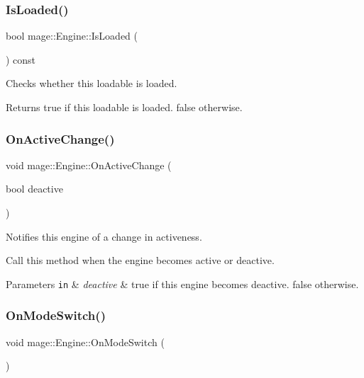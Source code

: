 \subsubsection{\texorpdfstring{Is\+Loaded()}{IsLoaded()}}
{\footnotesize\ttfamily bool mage\+::\+Engine\+::\+Is\+Loaded (\begin{DoxyParamCaption}{ }\end{DoxyParamCaption}) const\hspace{0.3cm}{\ttfamily [noexcept]}}

Checks whether this loadable is loaded.

\begin{DoxyReturn}{Returns}
{\ttfamily true} if this loadable is loaded. {\ttfamily false} otherwise. 
\end{DoxyReturn}
\hypertarget{classmage_1_1_engine_afd52a8088d6d37605cb352028098c508}{}\label{classmage_1_1_engine_afd52a8088d6d37605cb352028098c508} 
\subsubsection{\texorpdfstring{On\+Active\+Change()}{OnActiveChange()}}
{\footnotesize\ttfamily void mage\+::\+Engine\+::\+On\+Active\+Change (\begin{DoxyParamCaption}\item[{bool}]{deactive }\end{DoxyParamCaption})\hspace{0.3cm}{\ttfamily [noexcept]}}

Notifies this engine of a change in activeness.

Call this method when the engine becomes active or deactive.


\begin{DoxyParams}[1]{Parameters}
\mbox{\tt in}  & {\em deactive} & {\ttfamily true} if this engine becomes deactive. {\ttfamily false} otherwise. \\
\hline
\end{DoxyParams}
\hypertarget{classmage_1_1_engine_a6ac289fd093967c370955810e26d251f}{}\label{classmage_1_1_engine_a6ac289fd093967c370955810e26d251f} 
\subsubsection{\texorpdfstring{On\+Mode\+Switch()}{OnModeSwitch()}}
{\footnotesize\ttfamily void mage\+::\+Engine\+::\+On\+Mode\+Switch (\begin{DoxyParamCaption}{ }\end{DoxyParamCaption})\hspace{0.3cm}{\ttfamily [noexcept]}}


